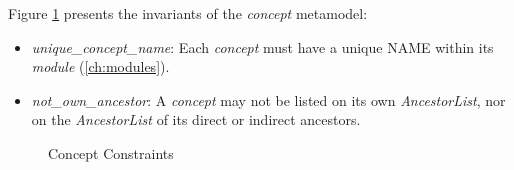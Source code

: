 \begin{constraints}
Figure \ref{fig:ocl:concept} presents the invariants of the \emph{concept} metamodel:

\begin{itemize}

\item \emph{unique\_concept\_name}:
Each \emph{concept} must have a unique NAME within its \emph{module} (\ref{ch:modules}).

\item \emph{not\_own\_ancestor}:
A \emph{concept} may not be listed on its own \emph{AncestorList},
nor on the \emph{AncestorList} of its direct or indirect ancestors.

\end{itemize}
\end{constraints}

\begin{figure}
\verbatimfont{\small}
\begin{framed}

\end{framed}
\caption{Concept Constraints}
\label{fig:ocl:concept}
\end{figure}
